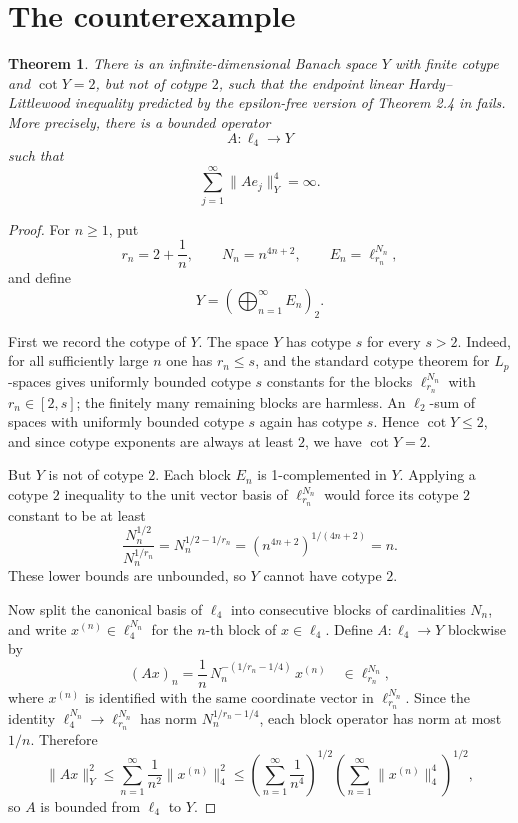 \documentclass[11pt]{article}
\newtheorem{theorem}{Theorem}
\begin{document}
\section{The counterexample}

\begin{theorem}
\label{thm:endpoint-failure}
There is an infinite-dimensional Banach space \(Y\) with finite cotype and
\(\cot Y=2\), but not of cotype \(2\), such that the endpoint linear
Hardy--Littlewood inequality predicted by the epsilon-free version of Theorem
2.4 in \cite{aron1602} fails.  More precisely, there is a bounded operator
\[
A:\ell_4\longrightarrow Y
\]
such that
\[
\sum_{j=1}^{\infty}\|A e_j\|_Y^4=\infty.
\]
\end{theorem}

\begin{proof}
For \(n\ge1\), put
\[
r_n=2+\frac1n,\qquad N_n=n^{4n+2},\qquad
E_n=\ell_{r_n}^{N_n},
\]
and define
\[
Y=\left(\bigoplus_{n=1}^{\infty}E_n\right)_2.
\]

First we record the cotype of \(Y\).  The space \(Y\) has cotype \(s\) for
every \(s>2\).  Indeed, for all sufficiently large \(n\) one has \(r_n\le s\),
and the standard cotype theorem for \(L_p\)-spaces gives uniformly bounded
cotype \(s\) constants for the blocks \(\ell_{r_n}^{N_n}\) with \(r_n\in[2,s]\);
the finitely many remaining blocks are harmless.  An \(\ell_2\)-sum of spaces
with uniformly bounded cotype \(s\) again has cotype \(s\).  Hence
\(\cot Y\le2\), and since cotype exponents are always at least \(2\), we have
\(\cot Y=2\).

But \(Y\) is not of cotype \(2\).  Each block \(E_n\) is 1-complemented in
\(Y\).  Applying a cotype \(2\) inequality to the unit vector basis of
\(\ell_{r_n}^{N_n}\) would force its cotype \(2\) constant to be at least
\[
\frac{N_n^{1/2}}{N_n^{1/r_n}}
=N_n^{1/2-1/r_n}
=\left(n^{4n+2}\right)^{1/(4n+2)}
=n.
\]
These lower bounds are unbounded, so \(Y\) cannot have cotype \(2\).

Now split the canonical basis of \(\ell_4\) into consecutive blocks of
cardinalities \(N_n\), and write \(x^{(n)}\in\ell_4^{N_n}\) for the \(n\)-th
block of \(x\in\ell_4\).  Define \(A:\ell_4\to Y\) blockwise by
\[
(Ax)_n
=
\frac1n\,N_n^{-(1/r_n-1/4)}\,x^{(n)}
\quad\in \ell_{r_n}^{N_n},
\]
where \(x^{(n)}\) is identified with the same coordinate vector in
\(\ell_{r_n}^{N_n}\).  Since the identity
\(\ell_4^{N_n}\to\ell_{r_n}^{N_n}\) has norm
\(N_n^{1/r_n-1/4}\), each block operator has norm at most \(1/n\).  Therefore
\[
\|Ax\|_Y^2
\le
\sum_{n=1}^{\infty}\frac1{n^2}\|x^{(n)}\|_4^2
\le
\left(\sum_{n=1}^{\infty}\frac1{n^4}\right)^{1/2}
\left(\sum_{n=1}^{\infty}\|x^{(n)}\|_4^4\right)^{1/2},
\]
so \(A\) is bounded from \(\ell_4\) to \(Y\).


\end{proof}
\end{document}

